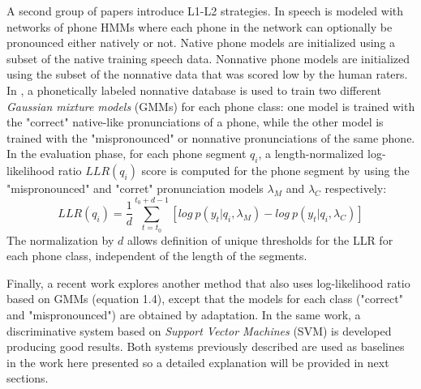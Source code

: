 A second group of papers introduce L1-L2 strategies. In \cite{detection_mispronunciation_instruction}
speech is modeled with networks of phone HMMs where each phone in the network can optionally
be pronounced either natively or not. Native phone models are initialized using a subset of
the native training speech data. Nonnative phone models are initialized using the subset of 
the nonnative data that was scored low by the human raters. 
In \cite{detection_phone_level_mispronunciation_learning}, a phonetically labeled nonnative
database is used to train two different \textit{Gaussian mixture models} (GMMs) for each phone
class: one model is trained with the "correct" native-like pronunciations of a phone, while the
other model is trained with the "mispronounced" or nonnative pronunciations of the same phone.
In the evaluation phase, for each phone segment $q_{i}$, a length-normalized log-likelihood ratio
$LLR(q_{i})$ score is computed for the phone segment by using the "mispronounced" and "corret"
pronunciation models $\lambda_{M}$ and $\lambda_{C}$ respectively:
\begin{equation}
LLR(q_{i}) = \frac{1}{d}\sum_{t=t_{0}}^{t_{0}+d-1} [log \ p(y_{t}|q_{i}, \lambda_{M}) - log \ p(y_{t}|q_{i}, \lambda_{C})]
\end{equation}
The normalization by $d$ allows definition of unique thresholds for the LLR for each phone class, 
independent of the length of the segments.

Finally, a recent work \cite{main} explores another method that also uses 
log-likelihood ratio based on  GMMs (equation 1.4), except that the models for each 
class ("correct" and  "mispronounced") are obtained by adaptation. In the same work, 
a discriminative system based
on \textit{Support Vector Machines} (SVM) is developed producing good results. Both systems
previously described are used as baselines in the work here presented so a detailed explanation
will be provided in next sections.

